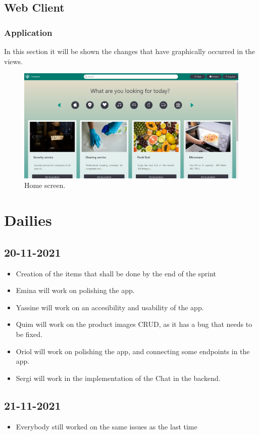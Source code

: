 \documentclass[./main.tex]{subfiles}
\begin{document}
\subsection{Web Client}
\subsubsection{Application}
In this section it will be shown the changes that have graphically occurred in the views.
\begin{figure}[H]
  \centering
  \includegraphics[width=0.5\linewidth]{img/webclient_2.png}
  \caption{Home screen.}
  \label{fig:webclient-screen-1}
\end{figure}

\section{Dailies}

\subsection{20-11-2021}
\begin{itemize}
	\item Creation of the items that shall be done by the end of the sprint
	\item Emina will work on polishing the app.
	\item Yassine will work on an accesibility and usability of the app.
	\item Quim will work on the product images CRUD, as it has a bug that needs to be fixed.
	\item Oriol will work on polishing the app, and connecting some endpoints in the app.
	\item Sergi will work in the implementation of the Chat in the backend.
\end{itemize}

\subsection{21-11-2021}
\begin{itemize}
	\item Everybody still worked on the same issues as the last time
\end{itemize}
\end{document}
